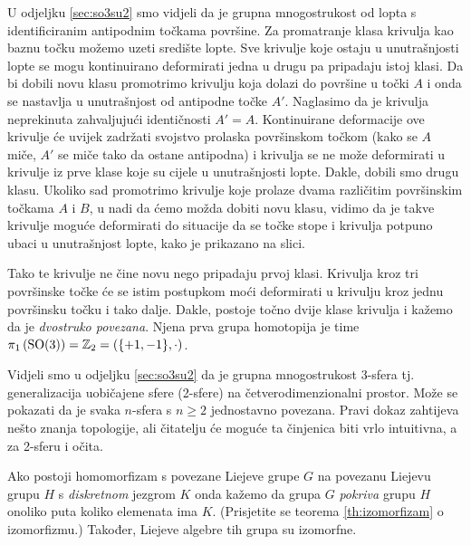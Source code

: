 \begin{primjer}[\SO{3}]


U odjeljku \ref{sec:so3su2} smo vidjeli da je grupna mnogostrukost od 
lopta s identificiranim antipodnim točkama površine.
Za promatranje
klasa krivulja kao baznu točku možemo uzeti središte lopte. Sve krivulje
koje ostaju u unutrašnjosti lopte se mogu kontinuirano deformirati jedna
u drugu pa pripadaju istoj klasi. Da bi dobili novu klasu promotrimo
krivulju koja dolazi do površine u točki $A$ i onda se nastavlja u unutrašnjost
od antipodne točke $A'$. Naglasimo da je krivulja neprekinuta zahvaljujući
identičnosti $A'=A$.
Kontinuirane deformacije ove krivulje će uvijek
zadržati svojstvo prolaska površinskom točkom (kako se $A$ miče, $A'$ se
miče tako da ostane antipodna) i krivulja se ne može deformirati u krivulje
iz prve klase koje su cijele u unutrašnjosti lopte. Dakle, dobili smo
drugu klasu. Ukoliko sad promotrimo krivulje koje prolaze dvama različitim površinskim
točkama $A$ i $B$, u nadi da ćemo možda dobiti novu klasu, vidimo da je takve
krivulje moguće deformirati do situacije da se točke stope i krivulja potpuno
ubaci u unutrašnjost lopte, kako je prikazano na slici.

\centerline{}

Tako te krivulje ne čine novu nego pripadaju prvoj klasi.
Krivulja kroz tri površinske točke će se istim postupkom moći deformirati u 
krivulju kroz jednu površinsku točku i tako dalje. Dakle, postoje točno dvije klase
krivulja i kažemo da je   \emph{dvostruko povezana}.
Njena prva grupa homotopija je time
    $\pi_1\left(\mathrm{SO}(3) \right) = \mathbb{Z}_{2} = (\{+1, -1\}, \cdot)$.
\end{primjer}

\begin{primjer}[\SU{2}]
Vidjeli smo u odjeljku \ref{sec:so3su2} da je
grupna mnogostrukost  3-sfera tj. generalizacija uobičajene
sfere (2-sfere) na četverodimenzionalni prostor. 
Može se pokazati da je svaka $n$-sfera s $n\ge 2$ jednostavno povezana.
Pravi dokaz zahtijeva nešto znanja topologije, ali čitatelju će
moguće ta činjenica biti vrlo intuitivna, a za 2-sferu i očita.
\end{primjer}

Ako postoji homomorfizam s povezane Liejeve grupe $G$ na povezanu Liejevu
grupu $H$ s \emph{diskretnom} jezgrom $K$ onda kažemo da grupa $G$ 
\emph{pokriva} grupu $H$ onoliko puta koliko elemenata ima $K$.
(Prisjetite se teorema \ref{th:izomorfizam} o izomorfizmu.)
Također, Liejeve algebre tih grupa su izomorfne.

